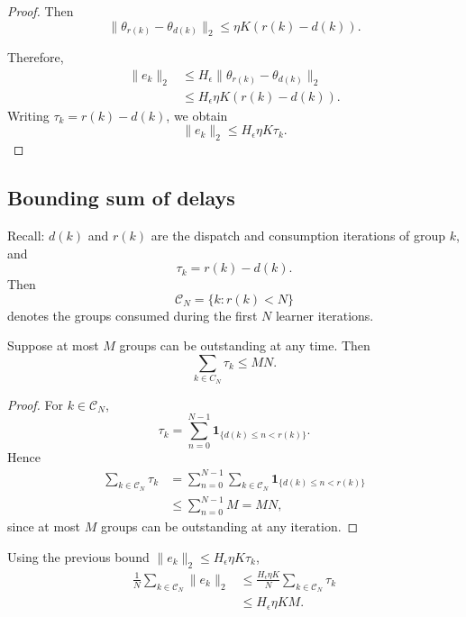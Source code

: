 \begin{proof}
Then
\begin{equation}
\|\theta_{r(k)}-\theta_{d(k)}\|_2
\le  \eta K(r(k)-d(k)).
\label{eq:parameter_drift}
\end{equation}

Therefore,
\begin{align*}
\|e_k\|_2
&\le H_\epsilon
\|\theta_{r(k)}-\theta_{d(k)}\|_2\\
&\le H_\epsilon\eta K(r(k)-d(k)).
\end{align*}
Writing $\tau_k=r(k)-d(k)$, we obtain
\begin{equation*}
\|e_k\|_2\le H_\epsilon\eta K\tau_k.
\end{equation*}
\end{proof}


\subsection{Bounding sum of delays}

Recall: $d(k)$ and $r(k)$ are the dispatch and consumption iterations of group $k$, and
$$
\tau_k=r(k)-d(k) .
$$
Then
$$
\mathcal{C}_N=\{k: r(k)<N\}
$$
denotes the groups consumed during the first $N$ learner iterations.

\begin{lemma} \label{lem:cumulative_delay}
    Suppose at most $M$ groups can be outstanding at any time. Then
    $$
\sum_{k \in C_N} \tau_k \leq M N .
$$
\end{lemma} 

\begin{proof}
For $k\in\mathcal C_N$,
\[
\tau_k
=\sum_{n=0}^{N-1}
\mathbf 1_{\{d(k)\le n<r(k)\}}.
\]
Hence
\begin{align*}
\sum_{k\in\mathcal C_N}\tau_k
&=\sum_{n=0}^{N-1}
\sum_{k\in\mathcal C_N}
\mathbf 1_{\{d(k)\le n<r(k)\}}\\
&\le\sum_{n=0}^{N-1}M
=MN,
\end{align*}
since at most $M$ groups can be outstanding
at any iteration.
\end{proof}

\begin{corollary}
Using the previous bound
$\|e_k\|_2\le H_\epsilon\eta K\tau_k$,
\begin{align*}
\frac1N\sum_{k\in\mathcal C_N}\|e_k\|_2
&\le\frac{H_\epsilon\eta K}{N}
\sum_{k\in\mathcal C_N}\tau_k\\
&\le H_\epsilon\eta KM.
\end{align*}
\end{corollary}

